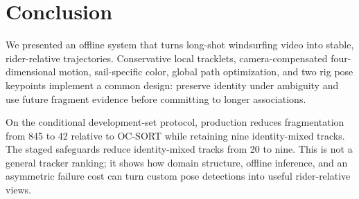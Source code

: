 \section{Conclusion}
\label{sec:conclusion}

We presented an offline system that turns long-shot windsurfing video into stable,
rider-relative trajectories.  Conservative local tracklets, camera-compensated
four-dimensional motion, sail-specific color, global path optimization, and two rig
pose keypoints implement a common design: preserve identity under ambiguity and use
future fragment evidence before committing to longer associations.

On the conditional development-set protocol, production reduces fragmentation from
845 to 42 relative to OC-SORT while retaining nine identity-mixed tracks.  The staged
safeguards reduce identity-mixed tracks from 20 to nine.  This is not a general tracker
ranking; it shows how domain structure, offline inference, and an asymmetric failure
cost can turn custom pose detections into useful rider-relative views.
